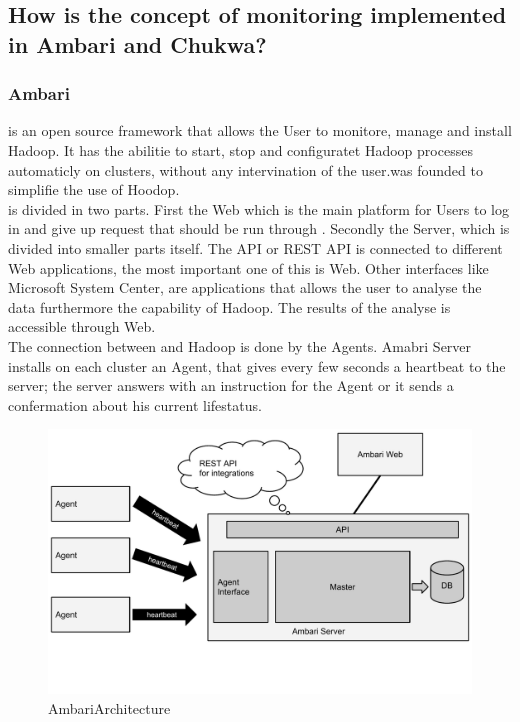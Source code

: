 \subsection{How is the concept of monitoring implemented in Ambari and Chukwa?}
\label{subsec:Implementation}

\subsubsection{Ambari}
\amb is an open source framework that allows the User to monitore, manage and install Hadoop. It has the abilitie to start, stop and configuratet Hadoop processes automaticly on clusters, without any intervination of the user.\amb was founded to simplifie the use of Hoodop. \cite{Sako2013}
\\
\amb is divided in two parts. First the \amb Web which is the main platform for Users to log in and give up request that should be run through \amb. Secondly the \amb Server, which is divided into smaller parts itself. The API or REST API is connected to different Web applications, the most important one of this is \amb Web. Other interfaces like Microsoft System Center, are applications that allows the user to analyse the data furthermore the capability of Hadoop. The results of the analyse is accessible through \amb Web.
\\
The connection between \amb and Hadoop is done by the \amb Agents. Amabri Server installs on each cluster an \amb Agent, that gives every few seconds a heartbeat to the server; the server answers with an instruction for the Agent or it sends a confermation about his current lifestatus. 
\\
\begin{figure}
\centering
\includegraphics[width=\linewidth,clip=true,trim=0 3cm 0 0]{images/AmbariArchitecture}
\caption{AmbariArchitecture}
\label{fig:AmbariArchitecture}
\end{figure}

